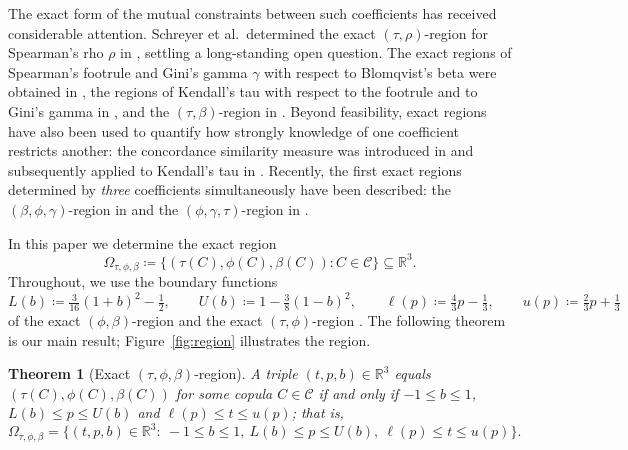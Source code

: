 \documentclass{article}
\newtheorem{theorem}{Theorem}[section]
\newcommand{\C}{\mathcal{C}}
\newcommand{\R}{\mathbb{R}}
\newcommand{\Om}{\Omega_{\tau,\phi,\beta}}
\begin{document}
The exact form of the mutual constraints between such coefficients has received considerable attention.
Schreyer et al.\ determined the exact $(\tau,\rho)$-region for Spearman's rho $\rho$ in \cite{schreyer2017exact}, settling a long-standing open question.
The exact regions of Spearman's footrule and Gini's gamma $\gamma$ with respect to Blomqvist's beta were obtained in \cite{kokolbukovsek2021spearman}, the regions of Kendall's tau with respect to the footrule and to Gini's gamma in \cite{kokolbukovsek2023exact}, and the $(\tau,\beta)$-region in \cite[Thm.~5]{kokolbukovsek2019relation}.
Beyond feasibility, exact regions have also been used to quantify how strongly knowledge of one coefficient restricts another: the concordance similarity measure was introduced in \cite{kokolbukovsek2022exact} and subsequently applied to Kendall's tau in \cite[Sec.~5]{kokolbukovsek2023exact}.
Recently, the first exact regions determined by \emph{three} coefficients simultaneously have been described: the $(\beta,\phi,\gamma)$-region in \cite{kokolbukovsek2026exact} and the $(\phi,\gamma,\tau)$-region in \cite{kokolbukovsek2026footrule}.

In this paper we determine the exact region
\[
\Om\coloneqq \bigl\{(\tau(C),\phi(C),\beta(C)):C\in\C\bigr\}\subseteq\R^3.
\]
Throughout, we use the boundary functions
\begin{equation}\label{eq:boundary-functions}
L(b)\coloneqq \tfrac{3}{16}(1+b)^2-\tfrac12,\qquad
U(b)\coloneqq 1-\tfrac38(1-b)^2,\qquad
\ell(p)\coloneqq \tfrac43 p-\tfrac13,\qquad
u(p)\coloneqq \tfrac23 p+\tfrac13
\end{equation}
of the exact $(\phi,\beta)$-region \cite[Thm.~11]{kokolbukovsek2021spearman} and the exact $(\tau,\phi)$-region \cite[Thm.~4]{kokolbukovsek2023exact}.
The following theorem is our main result; Figure~\ref{fig:region} illustrates the region.

\begin{theorem}[Exact $(\tau,\phi,\beta)$-region]\label{thm:main}
A triple $(t,p,b)\in\R^3$ equals $(\tau(C),\phi(C),\beta(C))$ for some copula $C\in\C$ if and only if $-1\le b\le 1$, $L(b)\le p\le U(b)$ and $\ell(p)\le t\le u(p)$; that is,
\begin{equation}\label{eq:region}
\Om=\bigl\{(t,p,b)\in\R^3:\ -1\le b\le 1,\ L(b)\le p\le U(b),\ \ell(p)\le t\le u(p)\bigr\}.
\end{equation}
\end{theorem}
\end{document}
